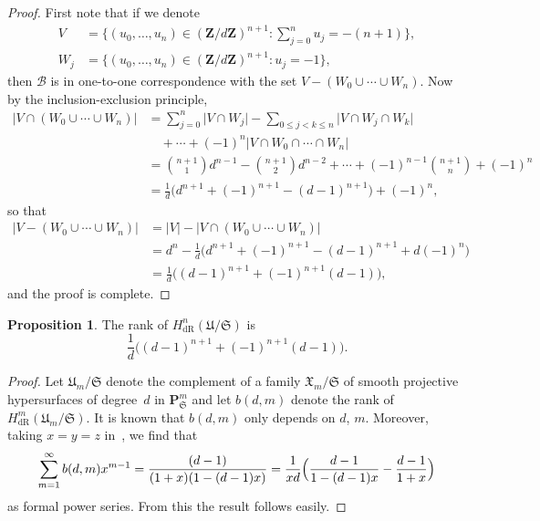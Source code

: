\documentclass[a4paper,11pt]{article}
\numberwithin{equation}{section}
\providecommand{\abs}[1]{\lvert#1\rvert}                 %
\newcommand{\ZZ}{\mathbf{Z}} %
\providecommand{\HdR}{H_{\text{dR}}}    %
\providecommand{\cB}{\mathcal{B}} %
\theoremstyle{definition}
\newtheorem{prop}[thm]{Proposition}
\begin{document}
\begin{proof}
First note that if we denote
\begin{align*}
V   &= \{(u_0,\dotsc,u_n) \in (\ZZ/d\ZZ)^{n+1} : \sum_{j=0}^n u_j = -(n+1)\}, \\
W_j &= \{(u_0,\dotsc,u_n) \in (\ZZ/d\ZZ)^{n+1} : u_j = -1 \},
\end{align*}
then  $\cB$ is in one-to-one correspondence with the set $V-(W_0 \cup \dotsb \cup W_n)$. 
Now by the inclusion-exclusion principle, 
\begin{align*}
\abs{V \cap (W_0 \cup \dotsb \cup W_n)} 
& = \sum_{j=0}^n \abs{V \cap W_j} 
    - \sum_{0 \leq j < k \leq n} \abs{V \cap W_j \cap W_k} \\
& \quad + \dotsb + (-1)^{n} \abs{V \cap W_0 \cap \dotsb \cap W_n} \\
& = {n+1 \choose 1} d^{n-1} -{n+1 \choose 2} d^{n-2} 
    + \dotsb + (-1)^{n-1} {n+1 \choose n} + (-1)^{n} \\
& = \frac{1}{d} \bigl(d^{n+1}+(-1)^{n+1} - (d-1)^{n+1}\bigr)+(-1)^n,
\end{align*}
so that
\begin{align*}
\abs{V-(W_0 \cup \dotsb \cup W_n)}&=\abs{V}-\abs{V \cap (W_0 \cup \dotsb \cup W_n)} \\
&= d^n - \frac{1}{d} \bigl(d^{n+1}+(-1)^{n+1} - (d-1)^{n+1}+d (-1)^n \bigr) \\
&= \frac{1}{d} \bigl((d-1)^{n+1} + (-1)^{n+1}(d-1) \bigr),
\end{align*}
and the proof is complete.
\end{proof}

\begin{prop} \label{prop:rankcoho}
The rank of $\HdR^n(\mathfrak{U}/\mathfrak{S})$ is
\[
\frac{1}{d} \bigl((d-1)^{n+1} + (-1)^{n+1}(d-1) \bigr).
\]
\end{prop}

\begin{proof}
Let $\mathfrak{U}_m/\mathfrak{S}$ denote the complement of a family
$\mathfrak{X}_m/\mathfrak{S}$ of smooth projective hypersurfaces of 
degree~$d$ in $\mathbf{P}^m_{\mathfrak{S}}$ and let $b(d,m)$ denote 
the rank of $\HdR^m(\mathfrak{U}_m/\mathfrak{S})$. It is known that 
$b(d,m)$ only depends on $d$, $m$. Moreover, taking $x=y=z$ 
in~\citep[Corollaire~2.4~(i)]{sga7}, we find that
\[
\sum_{m=1}^{\infty} b(d,m) x^{m-1} 
  = \frac{(d-1)}{(1+x)(1-(d-1)x)} 
  = \frac{1}{xd} \Bigl( \frac{d-1}{1-(d-1)x} - \frac{d-1}{1+x} \Bigr)
\]
as formal power series. From this the result follows easily. 
\end{proof}
\end{document}
